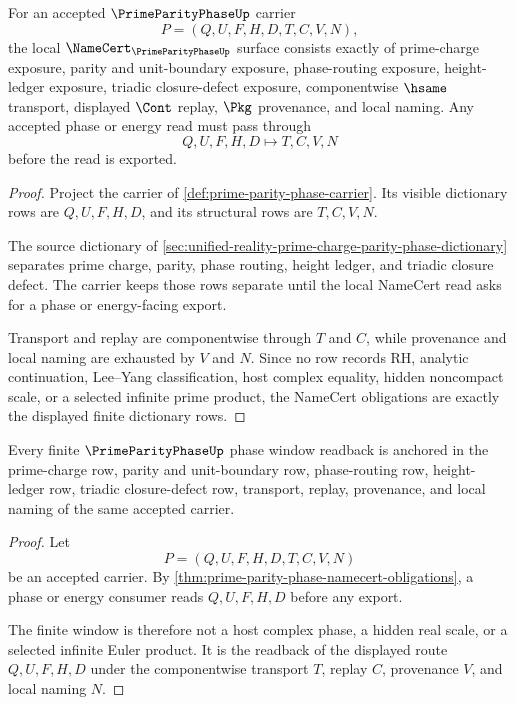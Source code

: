 \begin{theorem}
\label{thm:prime-parity-phase-namecert-obligations}
For an accepted $\PrimeParityPhaseUp$ carrier
$$
P=(Q,U,F,H,D,T,C,V,N),
$$
the local $\NameCert_{\PrimeParityPhaseUp}$ surface consists exactly of prime-charge exposure, parity and unit-boundary exposure, phase-routing exposure, height-ledger exposure, triadic closure-defect exposure, componentwise $\hsame$ transport, displayed $\Cont$ replay, $\Pkg$ provenance, and local naming. Any accepted phase or energy read must pass through
$$
Q,U,F,H,D \longmapsto T,C,V,N
$$
before the read is exported.
\end{theorem}
\begin{proof}
Project the carrier of \autoref{def:prime-parity-phase-carrier}. Its visible dictionary rows are $Q,U,F,H,D$, and its structural rows are $T,C,V,N$.

The source dictionary of \autoref{sec:unified-reality-prime-charge-parity-phase-dictionary} separates prime charge, parity, phase routing, height ledger, and triadic closure defect. The carrier keeps those rows separate until the local NameCert read asks for a phase or energy-facing export.

Transport and replay are componentwise through $T$ and $C$, while provenance and local naming are exhausted by $V$ and $N$. Since no row records RH, analytic continuation, Lee--Yang classification, host complex equality, hidden noncompact scale, or a selected infinite prime product, the NameCert obligations are exactly the displayed finite dictionary rows.
\end{proof}

\begin{theorem}
\label{thm:prime-parity-phase-window-readback}
Every finite $\PrimeParityPhaseUp$ phase window readback is anchored in the prime-charge row, parity and unit-boundary row, phase-routing row, height-ledger row, triadic closure-defect row, transport, replay, provenance, and local naming of the same accepted carrier.
\end{theorem}
\begin{proof}
Let
$$
P=(Q,U,F,H,D,T,C,V,N)
$$
be an accepted carrier. By \autoref{thm:prime-parity-phase-namecert-obligations}, a phase or energy consumer reads $Q,U,F,H,D$ before any export.

The finite window is therefore not a host complex phase, a hidden real scale, or a selected infinite Euler product. It is the readback of the displayed route $Q,U,F,H,D$ under the componentwise transport $T$, replay $C$, provenance $V$, and local naming $N$.
\end{proof}

